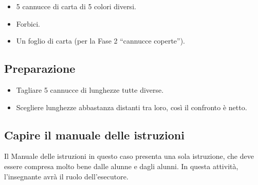 \begin{itemize}
\item
  5 cannucce di carta di 5 colori diversi.
\item
  Forbici.
\item
  Un foglio di carta (per la Fase 2 ``cannucce coperte'').
\end{itemize}

\subsection{Preparazione }\label{preparazione-6}

\begin{itemize}
\item
  Tagliare 5 cannucce di lunghezze tutte diverse.
\item
  Scegliere lunghezze abbastanza distanti tra loro, così il confronto è netto.
\end{itemize}

\subsection{Capire il manuale delle istruzioni }\label{capire-il-manuale-delle-istruzioni}

Il Manuale delle istruzioni in questo caso presenta una sola istruzione, che deve essere compresa molto bene dalle alunne e dagli alunni. In questa attività, l'insegnante avrà il ruolo dell'esecutore.

